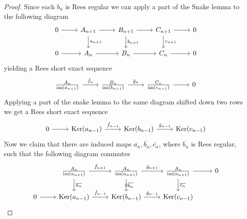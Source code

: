 \begin{proof}[Proof]
    Since each $b_{n}$ is Rees regular we can apply a part of the Snake lemma to the following diagram
    \[\begin{tikzcd}
        0 & {A_{n+1}} & {B_{n+1}} & {C_{n+1}} & 0 \\
        0 & {A_n} & {B_n} & {C_n} & 0
        \arrow[from=1-1, to=1-2]
        \arrow[from=1-2, to=1-3]
        \arrow["{a_{n+1}}", from=1-2, to=2-2]
        \arrow[from=1-3, to=1-4]
        \arrow["{b_{n+1}}", from=1-3, to=2-3]
        \arrow[from=1-4, to=1-5]
        \arrow["{c_{n+1}}", from=1-4, to=2-4]
        \arrow[from=2-1, to=2-2]
        \arrow[from=2-2, to=2-3]
        \arrow[from=2-3, to=2-4]
        \arrow[from=2-4, to=2-5]
    \end{tikzcd}\]
    yielding a Rees short exact sequence 
    \[\begin{tikzcd}
        {\frac{A_n}{\im(a_{n+1})}} & {\frac{B_n}{\im(b_{n+1})}} & {\frac{C_n}{\im(c_{n+1})}} & 0
        \arrow["{\hat{f}_n}", from=1-1, to=1-2]
        \arrow["{\hat{g}_n}", from=1-2, to=1-3]
        \arrow[from=1-3, to=1-4]
    \end{tikzcd}\]
    Applying a part of the snake lemma to the same diagram shifted down two rows we get a Rees short exact sequence
    \[\begin{tikzcd}
        0 & {\Kernel{a_{n-1}}} & {\Kernel{b_{n-1}}} & {\Kernel{c_{n-1}}}
        \arrow[from=1-1, to=1-2]
        \arrow["{\hat{f}_{n-1}}", from=1-2, to=1-3]
        \arrow["{\hat{g}_{n-1}}", from=1-3, to=1-4]
    \end{tikzcd}\]
    Now we claim that there are induced maps $\overline{a_{n}},\overline{b_{n}},\overline{c_{n}}$, where $\overline{b_{n}}$
    is Rees regular, such that the following diagram commutes 
    \[\begin{tikzcd}
        & {\frac{A_n}{\im(a_{n+1})}} & {\frac{A_n}{\im(a_{n+1})}} & {\frac{A_n}{\im(a_{n+1})}} & 0 \\
        0 & {\Kernel{a_{n-1}}} & {\Kernel{b_{n-1}}} & {\Kernel{c_{n-1}}}
        \arrow["{\hat{f}_{n+1}}", from=1-2, to=1-3]
        \arrow["{\overline{a_{n}}}", from=1-2, to=2-2]
        \arrow["{\hat{g}_{n+1}}", from=1-3, to=1-4]
        \arrow["{\overline{b_{n}}}", "\circ"{marking}, from=1-3, to=2-3]
        \arrow[from=1-4, to=1-5]
        \arrow["{\overline{c_{n}}}", from=1-4, to=2-4]
        \arrow[from=2-1, to=2-2]
        \arrow["{\hat{f}_{n-1}}", from=2-2, to=2-3]
        \arrow["{\hat{g}_{n-1}}", from=2-3, to=2-4]
    \end{tikzcd}\]

\end{proof}
